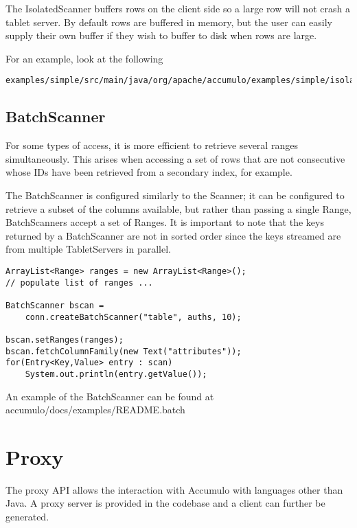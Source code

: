The IsolatedScanner buffers rows on the client side so a large row will not
crash a tablet server. By default rows are buffered in memory, but the user
can easily supply their own buffer if they wish to buffer to disk when rows are
large.

For an example, look at the following

\begingroup\fontsize{8pt}{8pt}\selectfont\begin{verbatim}
examples/simple/src/main/java/org/apache/accumulo/examples/simple/isolation/InterferenceTest.java
\end{verbatim}\endgroup

\subsection{BatchScanner}

For some types of access, it is more efficient to retrieve several ranges
simultaneously. This arises when accessing a set of rows that are not consecutive
whose IDs have been retrieved from a secondary index, for example.

The BatchScanner is configured similarly to the Scanner; it can be configured to
retrieve a subset of the columns available, but rather than passing a single Range,
BatchScanners accept a set of Ranges. It is important to note that the keys returned
by a BatchScanner are not in sorted order since the keys streamed are from multiple
TabletServers in parallel.

\begingroup\fontsize{8pt}{8pt}\selectfont\begin{verbatim}
ArrayList<Range> ranges = new ArrayList<Range>();
// populate list of ranges ...

BatchScanner bscan =
    conn.createBatchScanner("table", auths, 10);

bscan.setRanges(ranges);
bscan.fetchColumnFamily(new Text("attributes"));
for(Entry<Key,Value> entry : scan)
    System.out.println(entry.getValue());
\end{verbatim}\endgroup

An example of the BatchScanner can be found at\\
accumulo/docs/examples/README.batch

\section{Proxy}

The proxy API allows the interaction with Accumulo with languages other than Java.
A proxy server is provided in the codebase and a client can further be generated.

